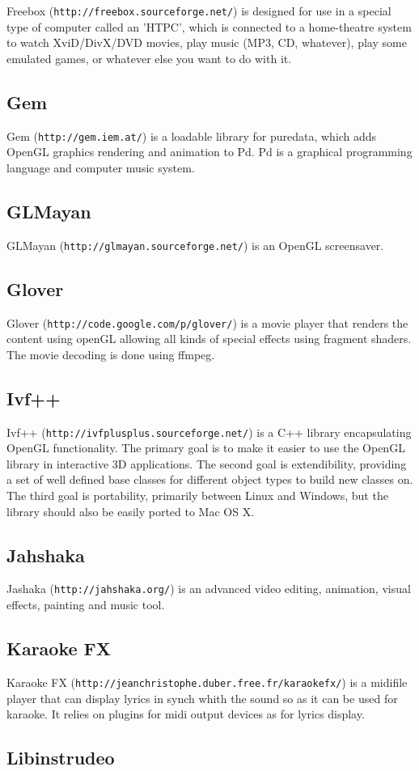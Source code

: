 Freebox ({\tt http://freebox.sourceforge.net/}) is designed for use in a special type of computer called an 'HTPC', which is connected to a home-theatre system to watch XviD/DivX/DVD movies, play music (MP3, CD, whatever), play some emulated games, or whatever else you want to do with it.\subsection{Gem}\label{ftgl-projects_gem}
Gem ({\tt http://gem.iem.at/}) is a loadable library for puredata, which adds OpenGL graphics rendering and animation to Pd. Pd is a graphical programming language and computer music system.\subsection{GLMayan}\label{ftgl-projects_glmayab}
GLMayan ({\tt http://glmayan.sourceforge.net/}) is an OpenGL screensaver.\subsection{Glover}\label{ftgl-projects_glover}
Glover ({\tt http://code.google.com/p/glover/}) is a movie player that renders the content using openGL allowing all kinds of special effects using fragment shaders. The movie decoding is done using ffmpeg.\subsection{Ivf++}\label{ftgl-projects_ivfplusplus}
Ivf++ ({\tt http://ivfplusplus.sourceforge.net/}) is a C++ library encapsulating OpenGL functionality. The primary goal is to make it easier to use the OpenGL library in interactive 3D applications. The second goal is extendibility, providing a set of well defined base classes for different object types to build new classes on. The third goal is portability, primarily between Linux and Windows, but the library should also be easily ported to Mac OS X.\subsection{Jahshaka}\label{ftgl-projects_jahshaka}
Jashaka ({\tt http://jahshaka.org/}) is an advanced video editing, animation, visual effects, painting and music tool.\subsection{Karaoke FX}\label{ftgl-projects_karaokefx}
Karaoke FX ({\tt http://jeanchristophe.duber.free.fr/karaokefx/}) is a midifile player that can display lyrics in synch whith the sound so as it can be used for karaoke. It relies on plugins for midi output devices as for lyrics display.\subsection{Libinstrudeo}\label{ftgl-projects_libinstrudeo}

